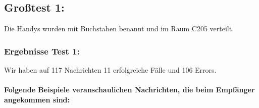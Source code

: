 \subsection{Großtest 1:}\label{grosstest-1}

Die Handys wurden mit Buchstaben benannt und im Raum C205 verteilt.

\subsubsection{Ergebnisse Test 1:}\label{ergebnisse-test-1}

Wir haben auf 117 Nachrichten 11 erfolgreiche Fälle und 106 Errors.

\paragraph*{Folgende Beispiele veranschaulichen Nachrichten, die beim
Empfänger angekommen sind:}

